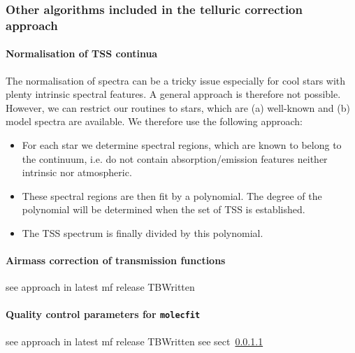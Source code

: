 \subsubsection{Other algorithms included in the telluric correction approach}\label{ssec:otheralgstellcorr}
\paragraph{Normalisation of \ac{TSS} continua\newline}\label{ssec:spec_normalisation}
The normalisation of spectra can be a tricky issue especially for cool stars with plenty intrinsic spectral features. A general approach is therefore not possible. However, we can restrict our routines to stars, which are (a) well-known and (b) model spectra are available. We therefore use the following approach: 
\begin{itemize}
    \item For each star we determine spectral regions, which are known to belong to the continuum, i.e. do not contain absorption/emission features neither intrinsic nor atmospheric.
    \item These spectral regions are then fit by a polynomial. The degree of the polynomial will be determined when the set of \ac{TSS} is established.
    \item The \ac{TSS} spectrum is finally divided by this polynomial.
\end{itemize} 

\paragraph{Airmass correction of transmission functions\newline}\label{ssec:airmass_corr}
see approach in latest mf release TBWritten

\paragraph{Quality control parameters for \texttt{molecfit}\newline}\label{ssec_tellcorr_qc_params}
see approach in latest mf release TBWritten see sect~\ref{ssec:spec_normalisation}